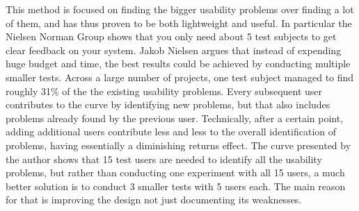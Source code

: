 This method is focused on finding the bigger usability problems over finding a lot of them, and has thus proven to be both lightweight and useful. In particular the Nielsen Norman Group\cite{5Users} shows that you only need about 5 test subjects to get clear feedback on your system. Jakob Nielsen argues that instead of expending huge budget and time, the best results could be achieved by conducting multiple smaller tests. Across a large number of projects, one test subject managed to find roughly 31\% of the the existing usability problems. Every subsequent user contributes to the curve by identifying new problems, but that also includes problems already found by the previous user. Technically, after a certain point, adding additional users contribute less and less to the overall identification of problems, having essentially a diminishing returns effect. The curve presented by the author shows that 15 test users are needed to identify all the usability problems, but rather than conducting one experiment with all 15 users, a much better solution is to conduct 3 smaller tests with 5 users each. The main reason for that is improving the design not just documenting its weaknesses.